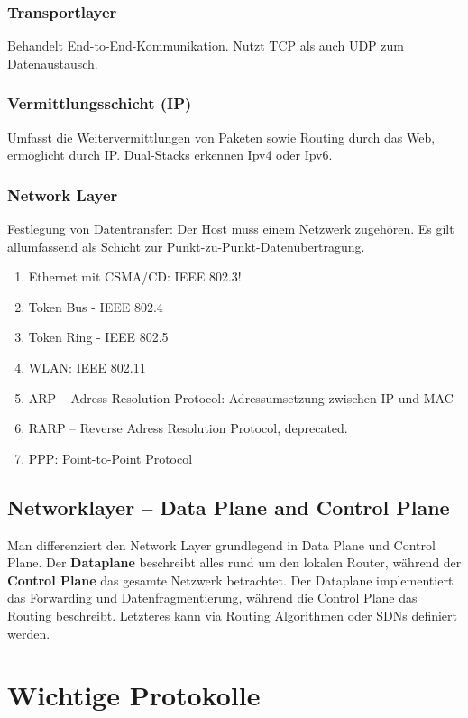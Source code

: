 \documentclass{article}
\begin{document}
    \subsubsection{Transportlayer}
    Behandelt End-to-End-Kommunikation. Nutzt TCP als auch UDP zum Datenaustausch. 
    
    \subsubsection{Vermittlungsschicht (IP)}
    Umfasst die Weitervermittlungen von Paketen sowie Routing durch das Web, ermöglicht durch IP. Dual-Stacks erkennen Ipv4 oder Ipv6.

    \subsubsection{Network Layer}
    Festlegung von Datentransfer: Der Host muss einem Netzwerk zugehören.
    Es gilt allumfassend als Schicht zur Punkt-zu-Punkt-Datenübertragung.
    \begin{enumerate}
        \item Ethernet mit CSMA/CD: IEEE 802.3!
        \item Token Bus - IEEE 802.4
        \item Token Ring - IEEE 802.5
        \item WLAN: IEEE 802.11
        \item ARP -- Adress Resolution Protocol: Adressumsetzung zwischen IP und MAC
    \item RARP -- Reverse Adress Resolution Protocol, deprecated.
    \item PPP: Point-to-Point Protocol        
    \end{enumerate}
    \subsection{Networklayer -- Data Plane and Control Plane}
    Man differenziert den Network Layer grundlegend in Data Plane und Control Plane.
    Der \textbf{Dataplane} beschreibt alles rund um den lokalen Router, während der \textbf{Control Plane} das gesamte Netzwerk betrachtet.
    Der Dataplane implementiert das Forwarding und Datenfragmentierung, während die Control Plane das Routing beschreibt. Letzteres kann via Routing Algorithmen oder SDNs definiert werden.
    
\section{Wichtige Protokolle}   
\end{document}
